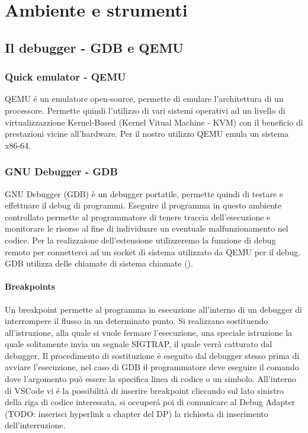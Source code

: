\chapter{Ambiente e strumenti}
\section{Il debugger - GDB e QEMU}
\subsection{Quick emulator - QEMU}
QEMU é un emulatore open-source, permette di emulare l'architettura di un processore. Permette quindi l'utilizzo di vari sistemi operativi ad un livello di virtualizzazzione Kernel-Based (Kernel Vitual Machine - KVM) con il beneficio di prestazioni vicine all'hardware. Per il nostro utilizzo QEMU emula un sistema x86-64. 
\subsection{GNU Debugger - GDB}
GNU Debugger (GDB) è un debugger portatile, permette quindi di testare e effettuare il debug di programmi. Eseguire il programma in questo ambiente controllato permette al programmatore di tenere traccia dell'esecuzione e monitorare le risorse al fine di individuare un eventuale malfunzionamento nel codice. Per la realizzaione dell'estensione utilizzeremo la funzione di debug remoto per connetterci ad un socket di sistema utilizzato da QEMU per il debug. GDB utilizza delle chiamate di sistema chiamate  (). 

\subsubsection{Breakpoints}
Un breakpoint permette al programma in esecuzione all'interno di un debugger di interrompere il flusso in un determinato punto. Si realizzano sostituendo all'istruzione, alla quale si vuole fermare l'esecuzione, una speciale istruzione la quale solitamente invia un segnale SIGTRAP, il quale verrà catturato dal debugger. Il procedimento di sostituzione è eseguito dal debugger stesso prima di avviare l'esecuzione, nel caso di GDB il programmatore deve eseguire il comando  dove l'argomento può essere la specifica linea di codice o un simbolo. All'interno di VSCode vi é la possibilità di inserire breakpoint cliccando sul lato sinistro della riga di codice interessata, si occuperá poi di comunicare al Debug Adapter (TODO: inserisci hyperlink a chapter del DP) la richiesta di inserimento dell'interruzione.

